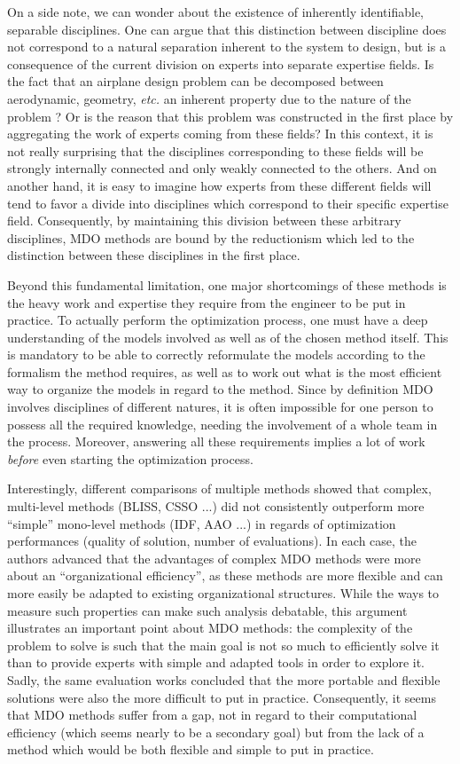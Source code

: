 On a side note, we can wonder about the existence of inherently identifiable,  separable disciplines. One can argue that this distinction between discipline does not correspond to a natural separation inherent to the system to design, but is a consequence of the current division on experts into separate expertise fields. Is the fact that an airplane design problem can be decomposed between aerodynamic, geometry, \emph{etc.} an inherent property due to the nature of the problem ? Or is the reason that this problem was constructed in the first place by aggregating the work of experts coming from these fields? In this context, it is not really surprising that the disciplines corresponding to these fields will be strongly internally connected and only weakly connected to the others. And on another hand, it is easy to imagine how experts from these different fields will tend to favor a divide into disciplines which correspond to their specific expertise field. Consequently, by maintaining this division between these arbitrary disciplines, MDO methods are bound by the reductionism which led to the distinction between these disciplines in the first place.

Beyond this fundamental limitation, one major shortcomings of these methods is the heavy work and expertise they require from the engineer to be put in practice. To actually perform the optimization process, one must have a deep understanding of the models involved as well as of the chosen method itself. This is mandatory to be able to correctly reformulate the models according to the formalism the method requires, as well as to work out what is the most efficient way to organize the models in regard to the method. Since by definition MDO involves disciplines of different natures, it is often impossible for one person to possess all the required knowledge, needing the involvement of a whole team in the process. Moreover, answering all these requirements implies a lot of work \emph{before} even starting the optimization process.

Interestingly, different comparisons of multiple methods \cite{perez2004evaluation,Yi2008} showed that complex, multi-level methods (BLISS, CSSO ...) did not consistently outperform more \enquote{simple} mono-level methods (IDF, AAO ...) in regards of optimization performances (quality of solution, number of evaluations). In each case, the authors advanced that the advantages of complex MDO methods were more about an \enquote{organizational efficiency}, as these methods are more flexible and can more easily be adapted to existing organizational structures. While the ways to measure such properties can make such analysis debatable, this argument illustrates an important point about MDO methods: the complexity of the problem to solve is such that the main goal is not so much to efficiently solve it than to provide experts with simple and adapted tools in order to explore it. Sadly, the same evaluation works concluded that the more portable and flexible solutions were also the more difficult to put in practice.  Consequently, it seems that MDO methods suffer from a gap, not in regard to their computational efficiency (which seems nearly to be a secondary goal) but from the lack of a method which would be both flexible and simple to put in practice.


